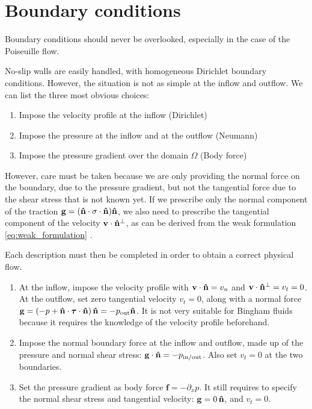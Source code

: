 \documentclass[11 pt]{report}
\begin{document}
\section{Boundary conditions}
\label{sec:boundary_conditions}
Boundary conditions should never be overlooked, especially in the case of the Poiseuille flow. 

No-slip walls are easily handled, with homogeneous Dirichlet boundary conditions. However, the situation is not as simple at the inflow and outflow. We can list the three most obvious choices:
\begin{enumerate}
    \item Impose the velocity profile at the inflow (Dirichlet)
    \item Impose the pressure at the inflow and at the outflow (Neumann)
    \item Impose the pressure gradient over the domain $\Omega$ (Body force)
\end{enumerate}

However, care must be taken because we are only providing the normal force on the boundary, due to the pressure gradient, but not the tangential force due to the shear stress that is not known yet. If we prescribe only the normal component of the traction $\mathbf{g}=(\mathbf{\hat n}\cdot\mathbf{\sigma}\cdot\mathbf{\hat n})\mathbf{\hat n}$, we also need to prescribe the tangential component of the velocity $\mathbf{v}\cdot\mathbf{\hat n}^\perp$, as can be derived from the weak formulation \cref{eq:weak_formulation} \cite{Bangerth}.

Each description must then be completed in order to obtain a correct physical flow.
\begin{enumerate}
    \item At the inflow, impose the velocity profile with $\mathbf{v} \cdot \mathbf{\hat n} = v_n$ and $\mathbf{v} \cdot \mathbf{\hat n}^\perp = v_t = 0$. At the outflow, set zero tangential velocity $v_t = 0$, along with a normal force $\mathbf{g} = (-p + \mathbf{\hat n}\cdot\boldsymbol\tau\cdot\mathbf{\hat n})\,\mathbf{\hat n} = -p_{\text{out}}\mathbf{\hat n}$. It is not very suitable for Bingham fluids because it requires the knowledge of the velocity profile beforehand.
    \item Impose the normal boundary force at the inflow and outflow, made up of the pressure and normal shear stress: $\mathbf{g} \cdot \mathbf{\hat n} = -p_{\text{in/out}}$. Also set $v_t=0$ at the two boundaries.
    \item Set the pressure gradient as body force $\mathbf{f} = -\partial_x p$. It still requires to specify the normal shear stress and tangential velocity: $\mathbf{g} = 0 \,\mathbf{\hat n}$, and $v_t=0$.
\end{enumerate}
\end{document}
